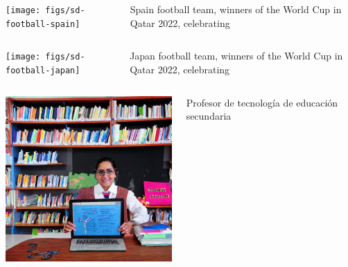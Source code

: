 \documentclass[17pt,aspectratio=169,hyperref={pdfusetitle,colorlinks,allcolors=olive}]{beamer}
\begin{document}
\begin{frame}[fragile]

    \begin{columns}[T]
    \begin{column}{.58\textwidth}
        \texttt{[image: figs/sd-football-spain]}
    \end{column}%
    \hfill%
    \begin{column}{.38\textwidth}
  Spain football team, winners of the World Cup in Qatar 2022, celebrating

    \end{column}%
  \end{columns}

\end{frame}

\begin{frame}[fragile]

    \begin{columns}[T]
    \begin{column}{.58\textwidth}
        \texttt{[image: figs/sd-football-japan]}
    \end{column}%
    \hfill%
    \begin{column}{.38\textwidth}
  Japan football team, winners of the World Cup in Qatar 2022, celebrating

    \end{column}%
  \end{columns}

\end{frame}


\begin{frame}[fragile]

    \begin{columns}[T]
    \begin{column}{.58\textwidth}
        \includegraphics[width=7.5cm]{figs/sd-profe-secundaria}
    \end{column}%
    \hfill%
    \begin{column}{.38\textwidth}
      Profesor de tecnología de educación secundaria
    \end{column}%
  \end{columns}

\end{frame}
\end{document}
